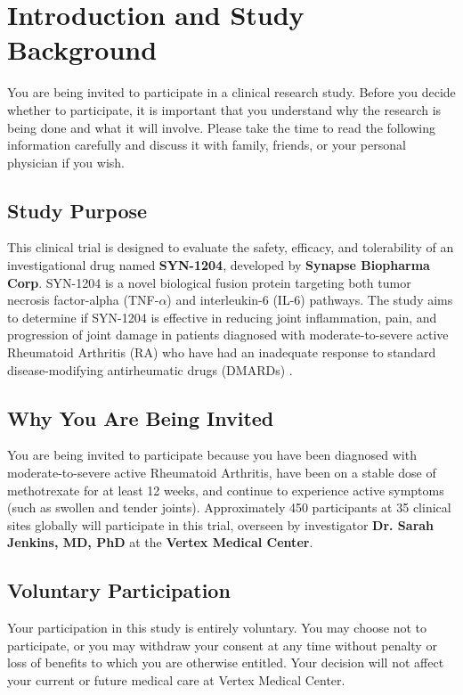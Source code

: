 \section{Introduction and Study Background}
You are being invited to participate in a clinical research study. Before you decide whether to participate, it is important that you understand why the research is being done and what it will involve. Please take the time to read the following information carefully and discuss it with family, friends, or your personal physician if you wish.

\subsection{Study Purpose}
This clinical trial is designed to evaluate the safety, efficacy, and tolerability of an investigational drug named \textbf{SYN-1204}, developed by \textbf{Synapse Biopharma Corp}. SYN-1204 is a novel biological fusion protein targeting both tumor necrosis factor-alpha (TNF-\(\alpha\)) and interleukin-6 (IL-6) pathways. The study aims to determine if SYN-1204 is effective in reducing joint inflammation, pain, and progression of joint damage in patients diagnosed with moderate-to-severe active Rheumatoid Arthritis (RA) who have had an inadequate response to standard disease-modifying antirheumatic drugs (DMARDs) \cite{smolen2020treat}.

\subsection{Why You Are Being Invited}
You are being invited to participate because you have been diagnosed with moderate-to-severe active Rheumatoid Arthritis, have been on a stable dose of methotrexate for at least 12 weeks, and continue to experience active symptoms (such as swollen and tender joints). Approximately 450 participants at 35 clinical sites globally will participate in this trial, overseen by investigator \textbf{Dr. Sarah Jenkins, MD, PhD} at the \textbf{Vertex Medical Center}.

\subsection{Voluntary Participation}
Your participation in this study is entirely voluntary. You may choose not to participate, or you may withdraw your consent at any time without penalty or loss of benefits to which you are otherwise entitled. Your decision will not affect your current or future medical care at Vertex Medical Center.
